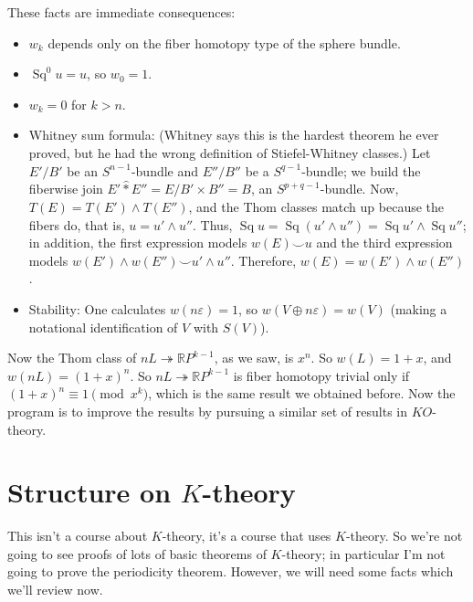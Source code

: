 \documentclass{article}
\providecommand{\OutputStructureOnKtheory}{10}
\newcommand{\R}{\mathbb{R}}
\newcommand{\RP}{\R P}
\newcommand{\sprod}{\wedge}
\newcommand{\onto}{\twoheadrightarrow}
\DeclareMathOperator{\Sq}{Sq}
\begin{document}
These facts are immediate consequences:
\begin{itemize}
\item $w_k$ depends only on the fiber homotopy type of the sphere bundle.
\item $\Sq^0 u = u$, so $w_0 = 1$.
\item $w_k = 0$ for $k > n$.
\item Whitney sum formula: (Whitney says this is the hardest theorem he ever proved, but he had the wrong definition of Stiefel-Whitney classes.)  Let $E' / B'$ be an $S^{n-1}$-bundle and $E'' / B''$ be a $S^{q-1}$-bundle; we build the fiberwise join $E' \hat\ast E'' = E / B' \times B'' = B$, an $S^{p+q-1}$-bundle.  Now, $T(E) = T(E') \sprod T(E'')$, and the Thom classes match up because the fibers do, %
that is, $u = u' \sprod u''$.  Thus, $\Sq u = \Sq(u' \sprod u'') = \Sq u' \sprod \Sq u''$; in addition, the first expression models $w(E) \smile u$ and the third expression models $w(E') \sprod w(E'') \smile u' \sprod u''$.  Therefore, $w(E) = w(E') \sprod w(E'')$.
\item Stability: One calculates $w(n\varepsilon) = 1$, so $w(V \oplus n\varepsilon) = w(V)$ (making a notational identification of $V$ with $S(V)$).
\end{itemize}

Now the Thom class of $nL \onto \RP^{k-1}$, as we saw, is $x^n$.  So $w(L) = 1 + x$, and $w(nL) = (1+x)^n$.  So $nL \onto \RP^{k-1}$ is fiber homotopy trivial only if $(1+x)^n \equiv 1 \pmod{x^k}$, which is the same result we obtained before.  Now the program is to improve the results by pursuing a similar set of results in $KO$-theory.

\fi
\section{Structure on \texorpdfstring{$K$}{K}-theory} %
\ifx\OutputStructureOnKtheory\undefined\else
This isn't a course about $K$-theory, it's a course that uses $K$-theory.  So we're not going to see proofs of lots of basic theorems of $K$-theory; in particular I'm not going to prove the periodicity theorem.  However, we will need some facts which we'll review now.
\end{document}
